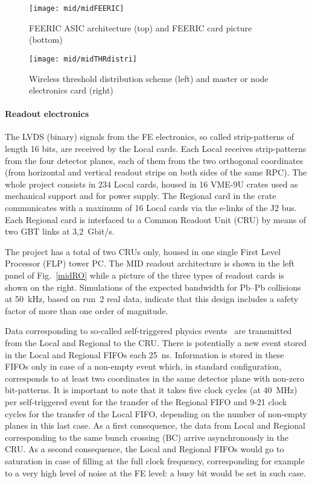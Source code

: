 \begin{figure}
\centering 
\texttt{[image: mid/midFEERIC]}
\caption{FEERIC ASIC architecture (top) and FEERIC card picture (bottom)}
\label{midFEERIC}
\end{figure}

\begin{figure}
\centering 
\texttt{[image: mid/midTHRdistri]}
\caption{Wireless threshold distribution scheme (left) and master or node electronics card (right)}
\label{midTHRdistri}
\end{figure}




\paragraph{Readout electronics\\}

The LVDS (binary) signals from the FE electronics, so called strip-patterns of length 16 bits, are received by the Local cards. 
Each Local receives strip-patterns from the four detector planes, each of them from the two orthogonal coordinates (from horizontal and vertical readout strips on both sides 
of the same RPC). The whole project consists in 234 Local cards, housed in 16 VME-9U crates used as mechanical support and for power supply. 
The Regional card in the crate communicates with a maximum of 16 Local cards via the e-links of the J2 bus. Each Regional card is interfaced to a Common Readout Unit (CRU) by means of two GBT links at 3,2~Gbit/s. 

The project has a total of two CRUs only, housed in one single First Level Processor (FLP) tower PC. The MID readout architecture is shown in the left panel of Fig.~\ref{midRO} while a picture of the three types of readout cards 
is shown on the right. Simulations of the expected bandwidth for Pb--Pb collisions at 50~kHz, based on run~2 real data, indicate that 
this design includes a safety factor of more than one order of magnitude. 

Data corresponding to so-called self-triggered physics events~\cite{mid:ROweb,mid:DataNote} are transmitted from the Local and Regional to the CRU. There is potentially a new event stored 
in the Local and Regional FIFOs each 25~ns. Information is stored in these FIFOs only in case of a non-empty event which, in standard configuration,
corresponds to at least two coordinates in the same detector plane with non-zero bit-patterns. 
It is important to note that it takes five clock cycles (at 40~MHz) per self-triggered event for the transfer of the Regional FIFO and 9-21 clock cycles for the transfer of the Local FIFO, depending on the
number of non-empty planes in this last case. As a first consequence, the data from Local and Regional corresponding to the same bunch crossing (BC) arrive asynchronously in the CRU. As a second consequence, the
Local and Regional FIFOs would go to saturation in case of filling at the full clock frequency, corresponding for example to a very high level of noise at the FE level: a busy bit would be set in such case.

